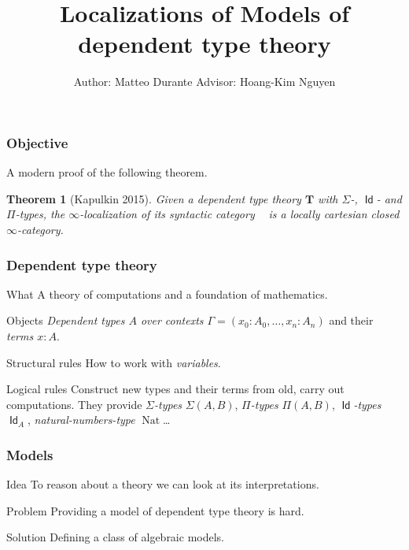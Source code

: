 \documentclass{beamer}
\title{Localizations of Models of dependent type theory}
\author{Author: Matteo Durante \quad\quad\quad Advisor: Hoang-Kim Nguyen}
\institute{Regensburg University}
\DeclareMathOperator{\Id}{\mathsf{Id}}
\DeclareMathOperator{\nat}{Nat}
\DeclareMathOperator{\Syn}{\mathsf{Syn}(\mathbf{T})}
\begin{document}
\theoremstyle{plain}

\newtheorem{thm}{Theorem}[section]
\newtheorem{prop}{Proposition}[section]
\newtheorem{defn}{Definition}[section]
\newtheorem{conj}{Conjecture}[section]
\newtheorem{lem}{Lemma}[section]
\newtheorem{construction}{Construction}[section]

\frame{\titlepage}

\begin{frame}
  \frametitle{Objective}

  A modern proof of the following theorem.

  \begin{thm}[Kapulkin 2015]
    Given a dependent type theory $\mathbf{T}$ with $\Sigma$-, $\Id$- and
    $\Pi$-types, the $\infty$-localization of its syntactic category $\Syn$ is a
    locally cartesian closed $\infty$-category.
  \end{thm}
\end{frame}

\begin{frame}
  \frametitle{Dependent type theory}
  
  \begin{block}{What}
    A theory of computations and a foundation of mathematics.
  \end{block}
  \pause

  \begin{block}{Objects}
    \emph{Dependent types $A$ over contexts
    $\Gamma=(x_0:A_0,\ldots,x_n:A_n)$} and their \emph{terms $x:A$}.
  \end{block}
  \pause

  \begin{block}{Structural rules}
    How to work with \emph{variables}.
  \end{block}
  \pause

  \begin{block}{Logical rules}
    Construct new types and their terms from old, carry out
    computations. They provide \emph{$\Sigma$-types}
    $\Sigma(A,B)$, \emph{$\Pi$-types}
    $\Pi(A,B)$, \emph{$\Id$-types} $\Id_A$, \emph{natural-numbers-type}
    $\nat$\ldots
  \end{block}
\end{frame}

\begin{frame}
  \frametitle{Models}

  \begin{block}{Idea}
    To reason about a theory we can look at its interpretations.
  \end{block}
  \pause

  \begin{block}{Problem}
    Providing a model of dependent type theory is hard.
  \end{block}
  \pause

  \begin{block}{Solution}
    Defining a class of algebraic models.
  \end{block}
\end{frame}
\end{document}

